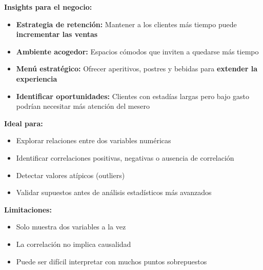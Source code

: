 \documentclass[
  spanish,
  letterpaper,
  DIV=11,
  numbers=noendperiod]{scrreprt}
\providecommand{\tightlist}{%
  \setlength{\itemsep}{0pt}\setlength{\parskip}{0pt}}
\begin{document}
\textbf{Insights para el negocio:}

\begin{itemize}
\tightlist
\item
  \textbf{Estrategia de retención:} Mantener a los clientes más tiempo
  puede \textbf{incrementar las ventas}
\item
  \textbf{Ambiente acogedor:} Espacios cómodos que inviten a quedarse
  más tiempo
\item
  \textbf{Menú estratégico:} Ofrecer aperitivos, postres y bebidas para
  \textbf{extender la experiencia}
\item
  \textbf{Identificar oportunidades:} Clientes con estadías largas pero
  bajo gasto podrían necesitar más atención del mesero
\end{itemize}

\begin{tcolorbox}[enhanced jigsaw, arc=.35mm, leftrule=.75mm, colbacktitle=quarto-callout-note-color!10!white, left=2mm, opacitybacktitle=0.6, toptitle=1mm, title=\textcolor{quarto-callout-note-color}{\faInfo}\hspace{0.5em}{¿Cuándo usar un gráfico de dispersión?}, colframe=quarto-callout-note-color-frame, toprule=.15mm, colback=white, rightrule=.15mm, opacityback=0, coltitle=black, breakable, bottomtitle=1mm, titlerule=0mm, bottomrule=.15mm]

\textbf{Ideal para:}

\begin{itemize}
\tightlist
\item
  Explorar relaciones entre dos variables numéricas
\item
  Identificar correlaciones positivas, negativas o ausencia de
  correlación\\
\item
  Detectar valores atípicos (outliers)
\item
  Validar supuestos antes de análisis estadísticos más avanzados
\end{itemize}

\textbf{Limitaciones:}

\begin{itemize}
\tightlist
\item
  Solo muestra dos variables a la vez
\item
  La correlación no implica causalidad
\item
  Puede ser difícil interpretar con muchos puntos sobrepuestos
\end{itemize}

\end{tcolorbox}
\end{document}
